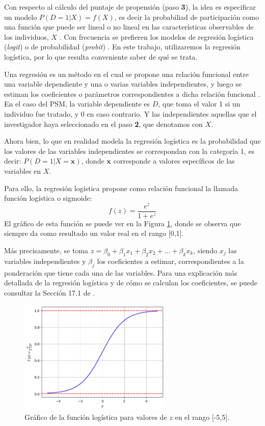 \documentclass[../../main.tex]{subfiles}
\begin{document}
Con respecto al cálculo del puntaje de propensión (paso \textbf{3}), la idea es
especificar un modelo \(P(D=1|X) = f(X)\), es decir la probabiliad de participación como
una función que puede ser lineal o no lineal en las características observables de los
individuos, \(X\) \cite{bernal}. Con frecuencia se prefieren los modelos de regresión
logística (\textit{logit}) o de probabilidad (\textit{probit}) \cite{bernal}. En este
trabajo, utilizaremos la regresión logística, por lo que resulta conveniente saber de qué
se trata.

Una regresión es un método en el cual se propone una relación funcional entre una variable
dependiente y una o varias variables independientes, y luego se estiman los coeficientes o
parámetros correspondientes a dicha relación funcional \cite{giuliodori-2022}. En el caso
del PSM, la variable dependiente es \(D\), que toma el valor 1 si un individuo fue
tratado, y 0 en caso contrario. Y las independientes aquellas que el investigador haya
seleccionado en el paso \textbf{2}, que denotamos con \(X\).

Ahora bien, lo que en realidad modela la regresión logística es la probabilidad que los
valores de las variables independientes se correspondan con la categoría 1, es decir:
\(P(D=1|X=\bm{x})\), donde \(\bm{x}\) corresponde a valores específicos de las variables
en \(X\).

Para ello, la regresión logística propone como relación funcional la llamada función
logística o sigmoide:
\[
    f(z) = \frac{e^z}{1 + e^z}
\]
El gráfico de esta función se puede ver en la Figura \ref{fig:logit}, donde se observa que
siempre da como resultado un valor real en el rango [0,1].

Más precisamente, se toma \(z = \beta_0 + \beta_1 x_1 + \beta_2 x_2 + \dots +
\beta_k x_k\), siendo \(x_j\) las variables independientes y \(\beta_j\) los coeficientes
a estimar, correspondientes a la ponderación que tiene cada una de las variables. Para
una explicación más detallada de la regresión logística y de cómo se calculan los coeficientes,
se puede consultar la Sección 17.1 de \cite{intro-econometria-wooldridge}.

\begin{figure}[ht]
    \centering
    \includegraphics[width=0.65\textwidth]{figs/logit.png}
    \caption{Gráfico de la función logística para valores de \(z\) en el rango [-5,5].}
    \label{fig:logit}
\end{figure}
\end{document}
